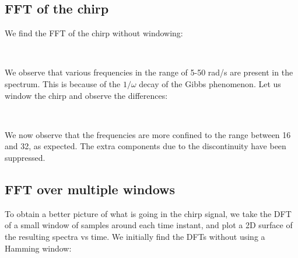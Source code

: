 \documentclass[11pt]{article}
\begin{document}
	
		
    \subsection{FFT of the chirp}\label{fft-of-the-chirp}

	

	
		
    We find the FFT of the chirp without windowing:

	

	

    \begin{center}
    \end{center}
    { \hspace*{\fill} \\}
    
	
		
    We observe that various frequencies in the range of 5-50 rad/s are
present in the spectrum. This is because of the \(1/\omega\) decay of
the Gibbs phenomenon. Let us window the chirp and observe the
differences:

	

	

    \begin{center}
    \end{center}
    { \hspace*{\fill} \\}
    
	
		
    We now observe that the frequencies are more confined to the range
between 16 and 32, as expected. The extra components due to the
discontinuity have been suppressed.

	

	
		
    \subsection{FFT over multiple windows}\label{fft-over-multiple-windows}

	

	
		
    To obtain a better picture of what is going in the chirp signal, we take
the DFT of a small window of samples around each time instant, and plot
a 2D surface of the resulting spectra vs time. We initially find the
DFTs without using a Hamming window:
\end{document}

